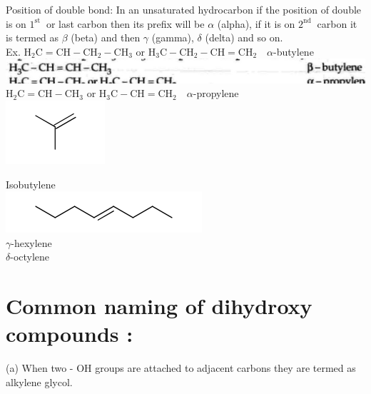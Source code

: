 \documentclass[10pt]{article}
\begin{document}
Position of double bond: In an unsaturated hydrocarbon if the position of double is on $1^{\text {st }}$ or last carbon then its prefix will be $\alpha$ (alpha), if it is on $2^{\text {nd }}$ carbon it is termed as $\beta$ (beta) and then $\gamma$ (gamma), $\delta$ (delta) and so on.\\
Ex. $\mathrm{H}_{2} \mathrm{C}=\mathrm{CH}-\mathrm{CH}_{2}-\mathrm{CH}_{3}$ or $\mathrm{H}_{3} \mathrm{C}-\mathrm{CH}_{2}-\mathrm{CH}=\mathrm{CH}_{2} \quad \alpha$-butylene\\
\includegraphics[max width=\textwidth, center]{2025_01_28_8470952b98110cec3aabg-013(2)}\\
$\mathrm{H}_{2} \mathrm{C}=\mathrm{CH}-\mathrm{CH}_{3}$ or $\mathrm{H}_{3} \mathrm{C}-\mathrm{CH}=\mathrm{CH}_{2} \quad \alpha$-propylene\\
\includegraphics{smile-bf8dfaeffee0d4292c2a0e033e99c369f87ffa98}

Isobutylene\\
\includegraphics{smile-4cd05599b48f91a9771f2bb9da55cdafdba33a2c}\\
$\gamma$-hexylene\\
$\delta$-octylene

\section*{Common naming of dihydroxy compounds :}
(a) When two - OH groups are attached to adjacent carbons they are termed as alkylene glycol.
\end{document}
